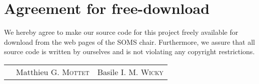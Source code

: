 \documentclass[11pt]{article}
\begin{document}
\newpage

\section*{Agreement for free-download} %
\thispagestyle{empty} %

\bigskip
\bigskip

\large We hereby agree to make our source code for this project freely available for download from the web pages of the SOMS chair. Furthermore, we assure that all source code is written by ourselves and is not violating any copyright restrictions.

\begin{center}

\bigskip
\bigskip

\begin{tabular}{@{}p{2cm}@{}p{6cm}@{}@{}p{6cm}@{}}
\begin{minipage}{3.3cm}
\end{minipage}
&
\begin{minipage}{6cm}
\vspace{3cm} \large{Matthieu G. \textsc{Mottet}}

\vspace{\baselineskip}

\end{minipage}
&
\begin{minipage}{6cm}

\vspace{3cm}\large{Basile I. M. \textsc{Wicky}}
\vspace{\baselineskip}
\end{minipage}
\end{tabular}


\end{center}
\newpage


\addtocounter{page}{1} %


\tableofcontents

\newpage


\end{document}
